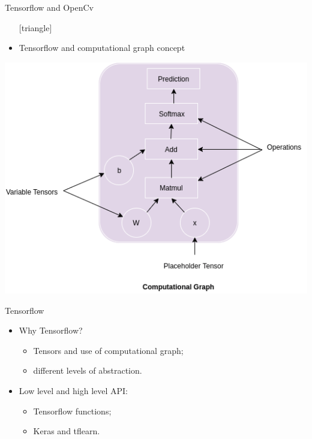 \documentclass{beamer}
\begin{document}
\begin{frame}{Tensorflow and OpenCv}
	\begin{itemize}
		\setlength\itemsep{1em}
		[triangle]
		\item 
			Tensorflow and computational graph concept
	\end{itemize}
	\begin{center}
    		\includegraphics[scale=0.4]{comp}
	\end{center}
\end{frame}

\begin{frame}{Tensorflow}
	\begin{itemize}
		\setlength\itemsep{1em}
		[triangle]
		\item
			Why Tensorflow?
			\begin{itemize}
				[circle]
				\item 
					Tensors and use of computational graph;
				\item 
					different levels of abstraction.
			\end{itemize}
		\item 
			Low level and high level API:
			\begin{itemize}
				[circle]
				\item 
					Tensorflow functions;
				\item 
					Keras and tflearn.
			\end{itemize}
	\end{itemize}
\end{frame}
\end{document}
